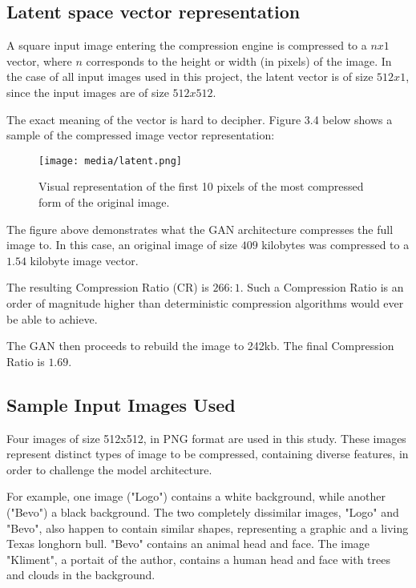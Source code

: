 \subsection{Latent space vector representation}

A square input image entering the compression engine is compressed to a $nx1$ vector, where $n$ corresponds to the height or width (in pixels)
of the image. In the case of all input images used in this project, the latent vector
is of size $512x1$, since the input images are of size $512x512$.

The exact meaning of the vector is hard to decipher. Figure 3.4 below shows a sample of the compressed image vector representation:

\begin{figure}[H]
	\begin{center}
	\texttt{[image: media/latent.png]}
	\end{center}
	\caption[Latent Space Representation]{Visual representation of the first 10 pixels of the most compressed form of the original image.}
	\end{figure}

The figure above demonstrates what the GAN architecture compresses the full image to. In this case, an original image 
of size $409$ kilobytes was compressed to a $1.54$ kilobyte image vector. 

The resulting Compression Ratio (CR) is $266:1$.
Such a Compression Ratio is an order of magnitude higher than deterministic compression algorithms would ever be able to achieve. 
\citep{Principles}

The GAN then proceeds to rebuild the image to 242kb. The final Compression Ratio is $1.69$.
\subsection{Sample Input Images Used}

Four images of size 512x512, in PNG format are used in this study.
These images represent distinct types of image to be compressed, containing 
diverse features, in order to challenge the model architecture.

For example, one image ("Logo") contains a white background, while another ("Bevo") a black background.
The two completely dissimilar images, "Logo" and "Bevo", also happen to contain similar shapes, representing a graphic and a living
Texas longhorn bull. "Bevo" contains an animal head and face.
The image "Kliment", a portait of the author, contains a human head and face with trees and clouds in the background.

